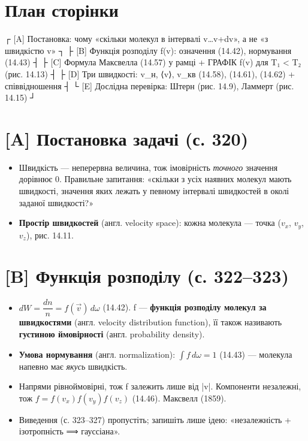 \documentclass[11pt,a4paper,oneside]{book}
\begin{document}
\section*{План сторінки}
\begin{layout}
┌ [A] Постановка: чому «скільки молекул в інтервалі v…v+dv», а не «з швидкістю v» ┐
├ [B] Функція розподілу f(v): означення (14.42), нормування (14.43)               ┤
├ [C] Формула Максвелла (14.57) у рамці + ГРАФІК f(v) для T₁ < T₂ (рис. 14.13)      ┤
├ [D] Три швидкості: v_н, ⟨v⟩, v_кв (14.58), (14.61), (14.62) + співвідношення     ┤
└ [E] Дослідна перевірка: Штерн (рис. 14.9), Ламмерт (рис. 14.15)                  ┘
\end{layout}

\section*{[A] Постановка задачі (с. 320)}
\begin{itemize}
\item Швидкість — неперервна величина, тож імовірність \textit{точного} значення дорівнює 0. Правильне запитання: «скільки з усіх наявних молекул мають швидкості, значення яких лежать у певному інтервалі швидкостей в околі заданої швидкості?»
\item \textbf{Простір швидкостей} (англ. velocity space): кожна молекула — точка ($v_{x}$, $v_{y}$, $v_{z}$), рис. 14.11.
\end{itemize}

\section*{[B] Функція розподілу (с. 322–323)}
\begin{itemize}
\item $dW = \dfrac{dn}{n} = f(\vec v)\,d\omega$ (14.42). f — \textbf{функція розподілу молекул за швидкостями} (англ. velocity distribution function), її також називають \textbf{густиною ймовірності} (англ. probability density).
\item \textbf{Умова нормування} (англ. normalization): $\int f\,d\omega = 1$ (14.43) — молекула напевно має \textit{якусь} швидкість.
\item Напрями рівноймовірні, тож f залежить лише від |v|. Компоненти незалежні, тож $f = f(v_x)f(v_y)f(v_z)$ (14.46). Максвелл (1859).
\item Виведення (с. 323–327) пропустіть; запишіть лише ідею: «незалежність + ізотропність ⟹ гауссіана».
\end{itemize}
\end{document}
